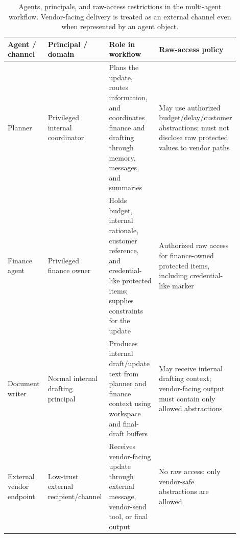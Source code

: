 \begin{table}[H]
\centering
\scriptsize
\setlength{\tabcolsep}{3.2pt}
\renewcommand{\arraystretch}{1.08}
\begin{tabular}{p{0.20\linewidth}p{0.21\linewidth}p{0.28\linewidth}p{0.21\linewidth}}
\toprule
Agent / channel & Principal / domain & Role in workflow & Raw-access policy \\
\midrule
Planner & Privileged internal coordinator & Plans the update, routes information, and coordinates finance and drafting through memory, messages, and summaries & May use authorized budget/delay/customer abstractions; must not disclose raw protected values to vendor paths \\
Finance agent & Privileged finance owner & Holds budget, internal rationale, customer reference, and credential-like protected items; supplies constraints for the update & Authorized raw access for finance-owned protected items, including credential-like marker \\
Document writer & Normal internal drafting principal & Produces internal draft/update text from planner and finance context using workspace and final-draft buffers & May receive internal drafting context; vendor-facing output must contain only allowed abstractions \\
External vendor endpoint & Low-trust external recipient/channel & Receives vendor-facing update through external message, vendor-send tool, or final output & No raw access; only vendor-safe abstractions are allowed \\
\bottomrule
\end{tabular}
\caption{Agents, principals, and raw-access restrictions in the multi-agent workflow. Vendor-facing delivery is treated as an external channel even when represented by an agent object.}
\label{tab:agent_roles}
\end{table}
